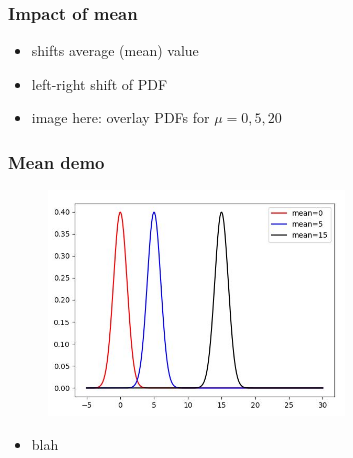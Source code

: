 \documentclass[english,14pt]{beamer}
\begin{document}

\begin{frame}[fragile]

\frametitle{Impact of mean}

\begin{itemize}
	\item shifts average (mean) value
	\item left-right shift of PDF
	\item image here: overlay PDFs for $\mu=0, 5, 20$
\end{itemize}

\end{frame}


\begin{frame}[fragile]

\frametitle{Mean demo}

\begin{figure}[ht]
	\centering
	\includegraphics[width=0.7\textwidth]{figures/meanDemoOutput}
\end{figure}

\begin{itemize}
	\item blah
\end{itemize}

\end{frame}

\end{document}

